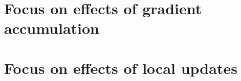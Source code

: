 

\section{Focus on effects of gradient accumulation}

\section{Focus on effects of local updates}


